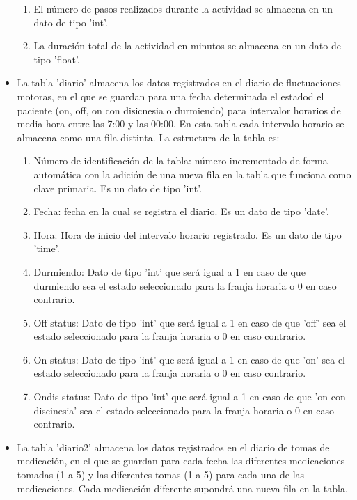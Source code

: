 \begin{itemize}
\begin{enumerate}
        \item El número de pasos realizados durante la actividad se almacena en un dato de tipo 'int'.
        \item La duración total de la actividad en minutos se almacena en un dato de tipo 'float'.
    \end{enumerate}
    \item La tabla 'diario' almacena los datos registrados en el diario de fluctuaciones motoras, en el que se guardan para una fecha determinada el estadod el paciente (on, off, on con disicnesia o durmiendo) para intervalor horarios de media hora entre las 7:00 y las 00:00. En esta tabla cada intervalo horario se almacena como una fila distinta. La estructura de la tabla es:
    \begin{enumerate}
        \item Número de identificación de la tabla: número incrementado de forma automática con la adición de una nueva fila en la tabla que funciona como clave primaria. Es un dato de tipo 'int'.
        \item Fecha: fecha en la cual se registra el diario. Es un dato de tipo 'date'.
        \item Hora: Hora de inicio del intervalo horario registrado. Es un dato de tipo 'time'.
        \item Durmiendo: Dato de tipo 'int' que será igual a 1 en caso de que durmiendo sea el estado seleccionado para la franja horaria o 0 en caso contrario.
        \item Off status: Dato de tipo 'int' que será igual a 1 en caso de que 'off' sea el estado seleccionado para la franja horaria o 0 en caso contrario.
        \item On status: Dato de tipo 'int' que será igual a 1 en caso de que 'on' sea el estado seleccionado para la franja horaria o 0 en caso contrario.
        \item Ondis status: Dato de tipo 'int' que será igual a 1 en caso de que 'on con discinesia' sea el estado seleccionado para la franja horaria o 0 en caso contrario.
    \end{enumerate}
    \item La tabla 'diario2' almacena los datos registrados en el diario de tomas de medicación, en el que se guardan para cada fecha las diferentes medicaciones tomadas (1 a 5) y las diferentes tomas (1 a 5) para cada una de las medicaciones. Cada medicación diferente supondrá una nueva fila en la tabla.
    \begin{enumerate}

\end{enumerate}
\end{itemize}
